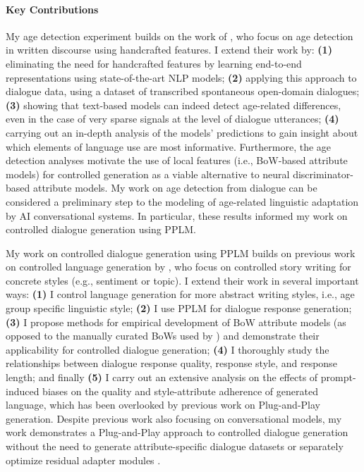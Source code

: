 \paragraph{Key Contributions}
My age detection experiment builds on the work of \cite{schler2006effects}, who focus on age detection in written discourse using handcrafted features. I extend their work by: \textbf{(1)} eliminating the need for handcrafted features by learning end-to-end representations using state-of-the-art NLP models; \textbf{(2)} applying this approach to dialogue data, using a dataset of transcribed spontaneous open-domain dialogues; \textbf{(3)} showing that text-based models can indeed detect age-related differences, even in the case of very sparse signals at the level of dialogue utterances; \textbf{(4)} carrying out an in-depth analysis of the models' predictions to gain insight about which elements of language use are most informative. Furthermore, the age detection analyses motivate the use of local features (i.e., BoW-based attribute models) for controlled generation as a viable alternative to neural discriminator-based attribute models. My work on age detection from dialogue can be considered a preliminary step to the modeling of age-related linguistic adaptation by AI conversational systems. In particular, these results informed my work on controlled dialogue generation using PPLM.

My work on controlled dialogue generation using PPLM builds on previous work on controlled language generation by \cite{dathathri2019plug}, who focus on controlled story writing for concrete styles (e.g., sentiment or topic). I extend their work in several important ways: \textbf{(1)} I control language generation for more abstract writing styles, i.e., age group specific linguistic style; \textbf{(2)} I use PPLM for dialogue response generation; \textbf{(3)} I propose methods for empirical development of BoW attribute models (as opposed to the manually curated BoWs used by \cite{dathathri2019plug}) and demonstrate their applicability for controlled dialogue generation; \textbf{(4)} I thoroughly study the relationships between dialogue response quality, response style, and response length; 
and finally \textbf{(5)} I carry out an extensive analysis on the effects of prompt-induced biases on the quality and style-attribute adherence of generated language, which has been overlooked by previous work on Plug-and-Play generation. 
Despite previous work also focusing on 
conversational models, my work demonstrates a Plug-and-Play approach to controlled dialogue generation without the need to generate attribute-specific dialogue datasets or separately optimize residual adapter modules \citep{madotto-etal-2020-plug}.

